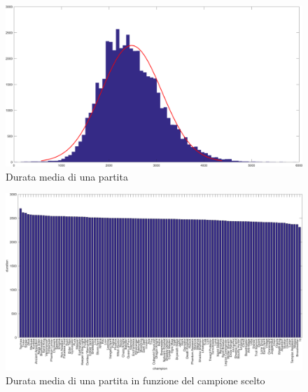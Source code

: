 \documentclass[a4paper,12pt,openany,oneside]{book}
\begin{document}
\begin{figure}
	\includegraphics[width=\linewidth]{pics/average_duration.png}
	\caption{Durata media di una partita}
	\label{fig:average_duration}
\end{figure}

\begin{figure}
	\includegraphics[width=\linewidth]{pics/duration_by_champ.png}
	\caption{Durata media di una partita in funzione del campione scelto}
	\label{fig:duration_by_champ}
\end{figure}
\end{document}
